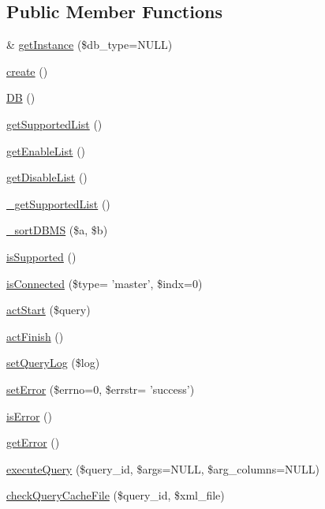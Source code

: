 \subsection*{Public Member Functions}
\begin{DoxyCompactItemize}
\item 
\& \hyperlink{classDB_a16f4a668b6429b4b9af5132cbf885213}{get\+Instance} (\$db\+\_\+type=N\+U\+L\+L)
\item 
\hyperlink{classDB_aad22e845daa75ae9ca9b97f7e3a89749}{create} ()
\item 
\hyperlink{classDB_a29a603c52c10831cddee82518417f992}{D\+B} ()
\item 
\hyperlink{classDB_a82226ac3fc6365c0771b13e389d216cf}{get\+Supported\+List} ()
\item 
\hyperlink{classDB_a0031322267656e8f6bc7f811ca21198b}{get\+Enable\+List} ()
\item 
\hyperlink{classDB_a65508ca8b2bb4ebf6dbb570caf9c8e40}{get\+Disable\+List} ()
\item 
\hyperlink{classDB_a7b0d1af98d9f53968631ca789d6d755c}{\+\_\+get\+Supported\+List} ()
\item 
\hyperlink{classDB_ab0a6d97fa16de74b4d991c9a4d633718}{\+\_\+sort\+D\+B\+M\+S} (\$a, \$b)
\item 
\hyperlink{classDB_a7517481bc9d24ad659f8d347688e481b}{is\+Supported} ()
\item 
\hyperlink{classDB_a217cc2096613d1758a9851f1dd990d71}{is\+Connected} (\$type= 'master', \$indx=0)
\item 
\hyperlink{classDB_a51a1ba94763a8211495eac18d74c80bb}{act\+Start} (\$query)
\item 
\hyperlink{classDB_a79cad647912ef780e967819e6346a742}{act\+Finish} ()
\item 
\hyperlink{classDB_a0adb7f453d6e8ed2e491d6708be7f9ec}{set\+Query\+Log} (\$log)
\item 
\hyperlink{classDB_af2584546ee78d07a40cc16493f8797cc}{set\+Error} (\$errno=0, \$errstr= 'success')
\item 
\hyperlink{classDB_ab1433763c6378f1085606424a1bfe27c}{is\+Error} ()
\item 
\hyperlink{classDB_a3956fe8725f824d8c0a4f3cba449d6df}{get\+Error} ()
\item 
\hyperlink{classDB_a2ac8db06615a3ded603d42c731a67ee3}{execute\+Query} (\$query\+\_\+id, \$args=N\+U\+L\+L, \$arg\+\_\+columns=N\+U\+L\+L)
\item 
\hyperlink{classDB_a0bbeb84cee13c54916b7f9aac6db4791}{check\+Query\+Cache\+File} (\$query\+\_\+id, \$xml\+\_\+file)

\end{DoxyCompactItemize}
